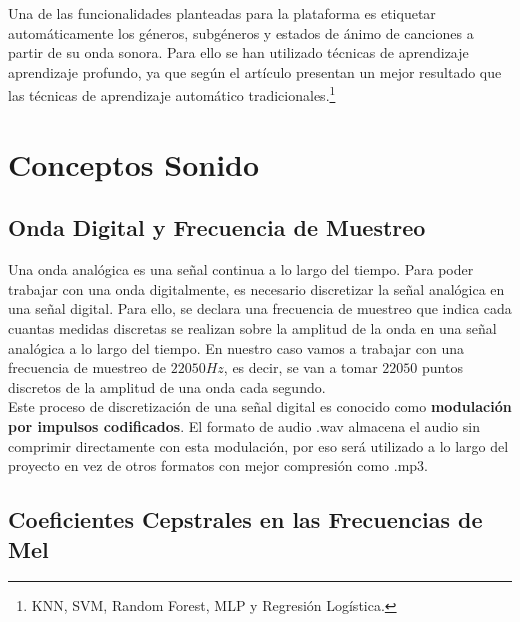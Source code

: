 
Una de las funcionalidades planteadas para la plataforma es etiquetar automáticamente los géneros, subgéneros y estados de ánimo de canciones a partir de su onda sonora. Para ello se han utilizado técnicas de aprendizaje aprendizaje profundo, ya que según el artículo \cite{deeplearn_vs_trad} presentan un mejor resultado que las técnicas de aprendizaje automático tradicionales.\footnote{KNN, SVM, Random Forest, MLP y Regresión Logística.}


\section{Conceptos Sonido}
\subsection{Onda Digital y Frecuencia de Muestreo}
Una onda analógica es una señal continua a lo largo del tiempo. Para poder trabajar con una onda digitalmente, es necesario discretizar la señal analógica en una señal digital.
Para ello, se declara una frecuencia de muestreo que indica cada cuantas medidas discretas se realizan sobre la amplitud de la onda en una señal analógica a lo largo del tiempo. En nuestro caso vamos a trabajar con una frecuencia de muestreo de $22050 Hz$, es decir, se van a tomar $22050$ puntos discretos de la amplitud de una onda cada segundo.\\
Este proceso de discretización de una señal digital es conocido como \textbf{modulación por impulsos codificados}. El formato de audio .wav almacena el audio sin comprimir directamente con esta modulación, por eso será utilizado a lo largo del proyecto en vez de otros formatos con mejor compresión como .mp3.


\subsection{Coeficientes Cepstrales en las Frecuencias de
Mel}\label{coeficientes-cepstrales-en-las-frecuencias-de-mel}


